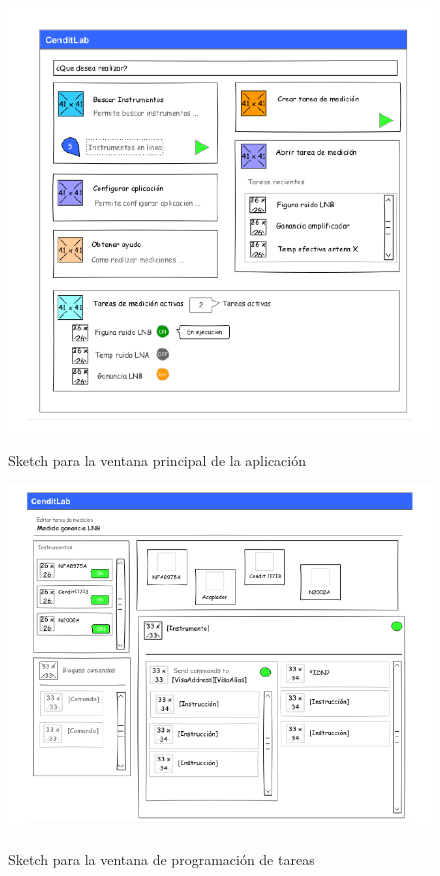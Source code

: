 \documentclass[paper=a4,oneside,fontsize=12pt]{scrartcl}
\begin{document}
	
	\begin{figure}[h!]
		\centering 
		\includegraphics[width=12cm]{Imagenes/MainWindowUI.pdf}
		\label{Fig:MainWndowUI} 
		\caption{Sketch para la ventana principal de la aplicación}
	\end{figure}

	

	\begin{figure}[h!]
		\centering 
		\includegraphics[width=12cm]{Imagenes/ProgramWindowUI.pdf}
		\label{Fig:ProgramWindowUI} 
		\caption{Sketch para la ventana de programación de tareas}
	\end{figure}
\end{document}

